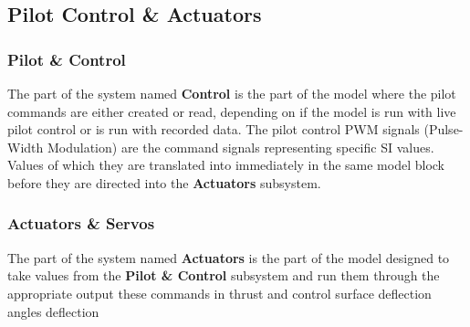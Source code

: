 \subsection{Pilot Control	 \& Actuators}

\subsubsection{Pilot \& Control}

The part of the system named \textbf{Control} is the part of the model where the pilot commands are either created or read, depending on if the model is run with live pilot control or is run with recorded data. The pilot control PWM signals (Pulse-Width Modulation) are the command signals representing specific SI values. Values of which they are translated into immediately in the same model block before they are directed into the \textbf{Actuators} subsystem.

\subsubsection{Actuators \& Servos}

The part of the system named \textbf{Actuators} is the part of the model designed to take values from the \textbf{Pilot \& Control} subsystem and run them through the appropriate  output these commands in thrust and control surface deflection angles deflection


